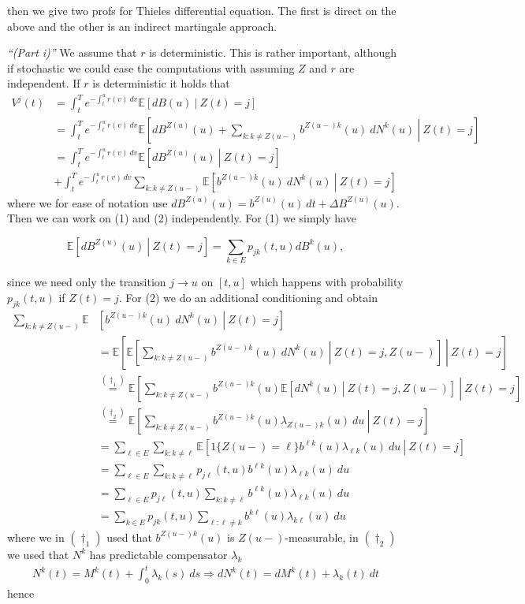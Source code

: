 \documentclass[a4paper,12pt,openany]{book}
\begin{document}
then we give two profs for Thieles differential equation. The first is direct on the above and the other is an indirect martingale approach.

\emph{``(Part i)''} We assume that \(r\) is deterministic. This is rather important, although if stochastic we could ease the computations with assuming \(Z\) and \(r\) are independent. If \(r\) is deterministic it holds that
\begin{align*}
V^j(t)&=\int_t^Te^{-\int_t^ur(v)\ dv}\mathbb E\left[\left.dB(u) \ \right\vert\ Z(t)= j\right]\\
&=\int_t^Te^{-\int_t^ur(v)\ dv}\mathbb E\left[\left. dB^{Z(u)}(u)+\sum_{k:k\ne Z(u-)}b^{Z(u-)k}(u)\ dN^k(u) \ \right\vert\ Z(t)= j\right]\\
&=\int_t^Te^{-\int_t^ur(v)\ dv}\mathbb E\left[\left. dB^{Z(u)}(u) \ \right\vert\ Z(t)= j\right]\tag{1}\\
&+\int_t^Te^{-\int_t^ur(v)\ dv}\sum_{k:k\ne Z(u-)}\mathbb E\left[\left. b^{Z(u-)k}(u)\ dN^k(u) \ \right\vert\ Z(t)= j\right]\tag{2}
\end{align*}
where we for ease of notation use \(dB^{Z(u)}(u)=b^{Z(u)}(u)\ dt+\Delta B^{Z(u)}(u)\). Then we can work on (1) and (2) independently. For (1) we simply have

\[
\mathbb E\left[\left. dB^{Z(u)}(u) \ \right\vert\ Z(t)= j\right]=\sum_{k\in E}p_{jk}(t,u)d B^k(u),
\]

since we need only the transition \(j\to u\) on \([t,u]\) which happens with probability \(p_{jk}(t,u)\) if \(Z(t)=j\). For (2) we do an additional conditioning and obtain
\begin{align*}
\sum_{k:k\ne Z(u-)}\mathbb E&\left[\left. b^{Z(u-)k}(u)\ dN^k(u) \ \right\vert\ Z(t)= j\right]\\
&=\mathbb E\left[\left.\mathbb E\left[\left.\sum_{k:k\ne Z(u-)} b^{Z(u-)k}(u)\ dN^k(u) \ \right\vert\ Z(t)= j,Z(u-)\right]\ \right\vert\ Z(t)= j\right]\\
&\stackrel{(\dagger_1)}{=}\mathbb E\left[\left.\sum_{k:k\ne Z(u-)} b^{Z(u-)k}(u)\mathbb E\left[\left. dN^k(u) \ \right\vert\ Z(t)= j,Z(u-)\right]\ \right\vert\ Z(t)= j\right]\\
&\stackrel{(\dagger_2)}{=}\mathbb E\left[\left.\sum_{k:k\ne Z(u-)} b^{Z(u-)k}(u)\lambda_{Z(u-)k}(u)\ du\ \right\vert\ Z(t)= j\right]\\
&=\sum_{\ell\in E}\sum_{k:k\ne \ell}\mathbb E\left[\left.1\{Z(u-)=\ell\} b^{\ell k}(u)\lambda_{\ell k}(u)\ du\ \right\vert\ Z(t)= j\right]\\
&=\sum_{\ell\in E}\sum_{k:k\ne \ell} p_{j\ell}(t,u) b^{\ell k}(u)\lambda_{\ell k}(u)\ du\\
&=\sum_{\ell\in E}p_{j\ell}(t,u)\sum_{k:k\ne \ell}  b^{\ell k}(u)\lambda_{\ell k}(u)\ du\\
&=\sum_{k\in E}p_{jk}(t,u)\sum_{\ell :\ell \ne k}  b^{k\ell }(u)\lambda_{k\ell }(u)\ du
\end{align*}
where we in \((\dagger_1)\) used that \(b^{Z(u-)k}(u)\) is \(Z(u-)\)-measurable, in \((\dagger_2)\) we used that \(N^k\) has predictable compensator \(\lambda_k\)
\begin{align*}
N^k(t)=M^k(t)+\int_0^t\lambda_k(s)\ ds\Rightarrow dN^k(t)=dM^k(t)+\lambda_k(t)\ dt
\end{align*}
hence
\end{document}
